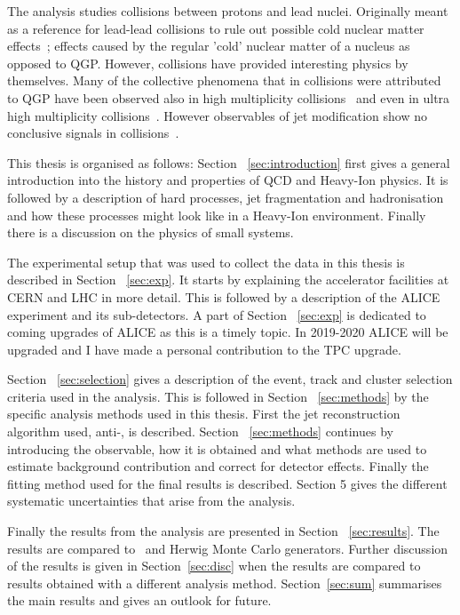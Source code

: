 The analysis studies collisions between protons and lead nuclei. Originally meant as a reference for lead-lead collisions to rule out possible cold nuclear matter effects~\cite{Connors:2017ptx}; effects caused by the regular 'cold' nuclear matter of a nucleus as opposed to QGP. However, \pPb collisions have provided interesting physics by themselves. Many of the collective phenomena that in \PbPb collisions were attributed to QGP have been observed also in high multiplicity \pPb collisions~\cite{Nagle:2018nvi} and even in ultra high multiplicity \pp collisions~\cite{Nagle:2018nvi}. However observables of jet modification show no conclusive signals in \pPb collisions~\cite{Connors:2017ptx,Nagle:2018nvi}. %

This thesis is organised as follows: Section ~\ref{sec:introduction} first gives a general introduction into the history and properties of QCD and Heavy-Ion physics. It is followed by a description of hard processes, jet fragmentation and hadronisation and how these processes might look like in a Heavy-Ion environment. Finally there is a discussion on the physics of small systems.

The experimental setup that was used to collect the data in this thesis is described in Section ~\ref{sec:exp}. It starts by explaining the accelerator facilities at CERN and LHC in more detail. This is followed by a description of the ALICE experiment and its sub-detectors. A part of Section ~\ref{sec:exp} is dedicated to coming upgrades of ALICE as this is a timely topic. In 2019-2020 ALICE will be upgraded and I have made a personal contribution to the TPC upgrade.

Section ~\ref{sec:selection} gives a description of the event, track and cluster selection criteria used in the analysis. This is followed in Section ~\ref{sec:methods} by the specific analysis methods used in this thesis. First the jet reconstruction algorithm used, anti-\kt{}, is described. Section ~\ref{sec:methods} continues by introducing the \jt{} observable, how it is obtained and what methods are used to estimate background contribution and correct for detector effects. Finally the fitting method used for the final results is described. Section 5 gives the different systematic uncertainties that arise from the analysis.

Finally the results from the analysis are presented in Section ~\ref{sec:results}. The results are compared to \pythia~and Herwig Monte Carlo generators. Further discussion of the results is given in Section~\ref{sec:disc} when the results are compared to \jt{} results obtained with a different analysis method. Section~\ref{sec:sum} summarises the main results and gives an outlook for future.


